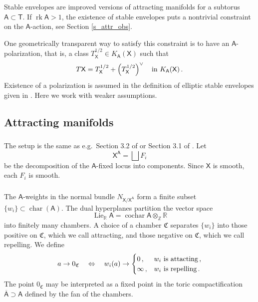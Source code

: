 \documentclass[14pt]{extarticle}
\newcommand{\Z}{\mathbb{Z}}
\newcommand{\R}{\mathbb{R}}
\newcommand{\bT}{\mathsf{T}}
\newcommand{\bA}{\mathsf{A}}
\newcommand{\bAb}{\overline{\bA}}
\newcommand{\bX}{\mathsf{X}}
\newcommand{\fC}{\mathfrak{C}}
\DeclareMathOperator{\Lie}{Lie}
\DeclareMathOperator{\cochar}{cochar}
\DeclareMathOperator{\cha}{char}
\DeclareMathOperator{\rk}{rk}
\theoremstyle{definition}
\begin{document}
\subsubsection{}
Stable envelopes are improved versions of attracting manifolds for a
subtorus $\bA \subset \bT$. If $\rk \bA > 1$, the existence of stable
envelopes puts a nontrivial constraint on the $\bA$-action, see Section
\ref{s_attr_obs}. 

One
geometrically transparent way to satisfy this constraint is to
have an $\bA$-polarization, that is, a class $T^{1/2}_\bX \in K_\bA(\bX)$
such
that
$$
T\bX = T^{1/2}_\bX + \left(T^{1/2}_\bX\right)^\vee \quad \textup{in $K_\bA(\bX)$}\,. 
$$
Existence of a polarization is assumed in
the definition of elliptic stable envelopes
given in \cite{ese}. Here we work with weaker assumptions.  



\subsection{Attracting manifolds}

\subsubsection{}

The setup is the same as e.g.\ Section 3.2 of \cite{MO1} or Section
3.1 of \cite{ese}. Let
$$
\bX^\bA = \bigsqcup F_i
$$
be the decomposition of the $\bA$-fixed locus into components. Since $\bX$ is smooth, each $F_i$
is smooth.


\subsubsection{} \label{s_fC} 

The $\bA$-weights in the normal bundle $N_{\bX/\bX^\bA}$ form a finite subset $\{w_i\}
\subset \cha(\bA)$. The dual hyperplanes partition the vector space 
%
\begin{equation}
\Lie_\R \bA = \cochar \bA \otimes_\Z \R\label{LieR}
\end{equation}
%
into finitely many
chambers. A choice of a chamber 
$\fC$ separates  $\{w_i\}$ into those positive on $\fC$,
which we call attracting, and those negative on $\fC$, which we call
repelling. We define
$$
a \to  0_\fC  \quad \Leftrightarrow \quad
w_i(a) \to
\begin{cases}
  0\,, & \textup{$w_i$ is attacting} \,,\\
  \infty\,, & \textup{$w_i$ is repelling} \,. 
\end{cases}
$$
The point $0_\fC$ may be interpreted as a fixed point in the  toric compactification 
$\bAb \supset \bA$ defined by the fan of the chambers. 
\end{document}
